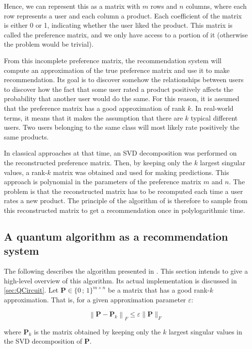 \documentclass[11pt, a4paper]{article}
\begin{document}
            Hence, we can represent this as a matrix with \(m\) rows and \(n\) columns, where each row represents a user and each column a product. Each coefficient of the matrix is either 0 or 1, indicating whether the user liked the product. This matrix is called the preference matrix, and we only have access to a portion of it (otherwise the problem would be trivial).
            
            From this incomplete preference matrix, the recommendation system will compute an approximation of the true preference matrix and use it to make recommendation. Its goal is to discover somehow the relationships between users to discover how the fact that some user rated a product positively affects the probability that another user would do the same. For this reason, it is assumed that the preference matrix has a good approximation of rank \(k\). In real-world terms, it means that it makes the assumption that there are \(k\) typical different users. Two users belonging to the same class will most likely rate positively the same products.
            
            In classical approaches at that time, an SVD decomposition was performed on the reconstructed preference matrix. Then, by keeping only the \(k\) largest singular values, a rank-\(k\) matrix was obtained and used for making predictions. This approach is polynomial in the parameters of the preference matrix \(m\) and \(n\). The problem is that the reconstructed matrix has to be recomputed each time a user rates a new product. The principle of the algorithm of \citeauthor{QRS} is therefore to sample from this reconstructed matrix to get a recommendation once in polylogarithmic time.
        \subsection{A quantum algorithm as a recommendation system}
            The following describes the algorithm presented in \cite{QRS}. This section intends to give a high-level overview of this algorithm. Its actual implementation is discussed in \autoref{sec:QCircuit}. Let \(\mathbf{P}\in\{0\,;\,1\}^{m\times n}\) be a matrix that has a good rank-\(k\) approximation. That is, for a given approximation parameter \(\varepsilon\):
            
            \[\left\|\mathbf{P} - \mathbf{P}_k\right\|_F\leqslant\varepsilon\|\mathbf{P}\|_F\]
            
            where \(\mathbf{P}_k\) is the matrix obtained by keeping only the \(k\) largest singular values in the SVD decomposition of \(\mathbf{P}\).
            
\end{document}
